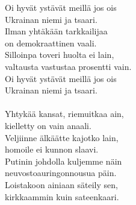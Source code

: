 
            Oi hyvät ystävät meillä jos ois \\
            Ukrainan niemi ja tsaari. \\
            Ilman yhtäkään tarkkailijaa \\
            on demokraattinen vaali. \\
            Silloinpa toveri huolta ei lain, \\
            valtausta vastustaa prosentti vain. \\
            Oi hyvät ystävät meillä jos ois \\
            Ukrainan niemi ja tsaari. \\
\hspace{10mm} \\
            Yhtykää kansat, riemuitkaa ain, \\
            kielletty on vain anaali. \\
            Veljiinne älkäätte kajotko lain, \\
            homoile ei kunnon slaavi. \\
            Putinin johdolla kuljemme näin \\
            neuvostoauringonnousua päin. \\
            Loistakoon ainiaan säteily sen, \\
            kirkkaammin kuin sateenkaari. \\

